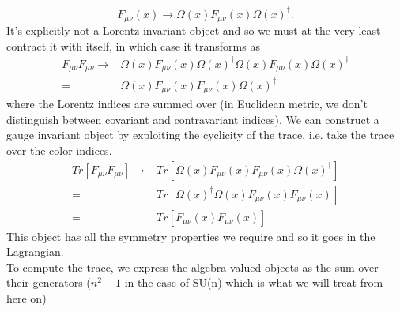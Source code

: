 \documentclass[a4paper,10pt]{book}
\begin{document}
\begin{equation}
F_{\mu \nu}(x) \rightarrow \Omega(x) F_{\mu \nu}(x) \Omega(x)^{\dagger}.
\end{equation}
It's explicitly not a Lorentz invariant object and so we must at the very least contract it with itself, in which case it transforms as 
\begin{equation}
\begin{aligned}
F_{\mu \nu}F_{\mu \nu} \rightarrow& \Omega(x) F_{\mu \nu}(x) \Omega(x)^{\dagger}\Omega(x) F_{\mu \nu}(x) \Omega(x)^{\dagger}\\
=&\Omega(x) F_{\mu \nu}(x) F_{\mu \nu}(x) \Omega(x)^{\dagger}
\end{aligned}
\end{equation}
where the Lorentz indices are summed over (in Euclidean metric, we don't distinguish between covariant and contravariant indices). We can construct a gauge invariant object by exploiting the cyclicity of the trace, i.e. take the trace over the color indices.
\begin{equation}
\begin{aligned}
Tr\left[F_{\mu \nu}F_{\mu \nu}\right] \rightarrow& Tr\left[\Omega(x) F_{\mu \nu}(x) F_{\mu \nu}(x) \Omega(x)^{\dagger}\right]\\
=&Tr\left[\Omega(x)^{\dagger}\Omega(x) F_{\mu \nu}(x) F_{\mu \nu}(x) \right]\\
=&Tr\left[F_{\mu \nu}(x) F_{\mu \nu}(x) \right]
\end{aligned}
\end{equation}
This object has all the symmetry properties we require and so it goes in the Lagrangian.\\To compute the trace, we express the algebra valued objects as the sum over their generators ($n^2-1$ in the case of SU(n) which is what we will treat from here on)
\end{document}
